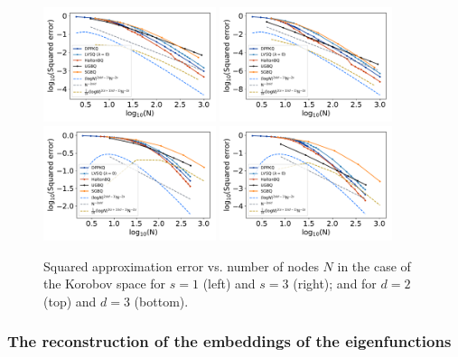 \documentclass[twoside,11pt]{book}
\numberwithin{theorem}{chapter}
\numberwithin{definition}{chapter}
\numberwithin{proposition}{chapter}
\numberwithin{corollary}{chapter}
\numberwithin{example}{chapter}
\numberwithin{lemma}{chapter}
\begin{document}
\begin{figure}
\centering
\includegraphics[width=0.45\textwidth]{img/neurips/multiSobolev/Sobolev_2D_ko_1_fig_2.pdf}
\includegraphics[width=0.45\textwidth]{img/neurips/multiSobolev/Sobolev_2D_ko_2_fig_2.pdf}\\
\includegraphics[width=0.45\textwidth]{img/neurips/multiSobolev/Sobolev_3D_ko_1_fig_2.pdf}
\includegraphics[width=0.45\textwidth]{img/neurips/multiSobolev/Sobolev_3D_ko_2_fig_2.pdf}
\caption{Squared approximation error vs. number of nodes $N$ in the case of the Korobov space for $s = 1$ (left) and $s=3$ (right); and for $d =2$ (top) and $d=3$ (bottom).
\label{fig:Korobov_DPPKQ_multialgo_results}}
\end{figure} 

\subsubsection{The reconstruction of the embeddings of the eigenfunctions}
\end{document}
